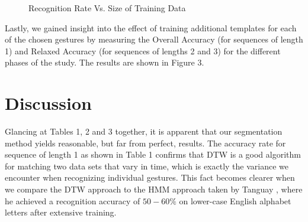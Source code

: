 \documentclass[twoside]{article}
\begin{document}
\begin{multicols}{2}
\begin{figure}[H]
\centering
{}	
	\caption{Recognition Rate Vs. Size of Training Data}
	\label{fig3}
\end{figure}

Lastly, we gained insight into the effect of training additional templates for each of the chosen gestures by measuring the Overall Accuracy (for sequences of length 1) and Relaxed Accuracy (for sequences of lengths 2 and 3) for the different phases of the study. The results are shown in Figure 3.

\section{Discussion}


Glancing at Tables 1, 2 and 3 together, it is apparent that our segmentation
method yields reasonable, but far from perfect, results. The accuracy rate for
sequence of length 1 as shown in Table 1 confirms that DTW is a
good algorithm for matching two data sets that vary in time,
which is exactly the variance we encounter when recognizing individual gestures.
This fact becomes clearer when we compare the DTW approach to the HMM approach taken by Tanguay \cite{tanguay_jr_hidden_1995}, where he
achieved a recognition accuracy of
$50-60\%$ on lower-case English alphabet letters after extensive training.


\end{multicols}
\end{document}
